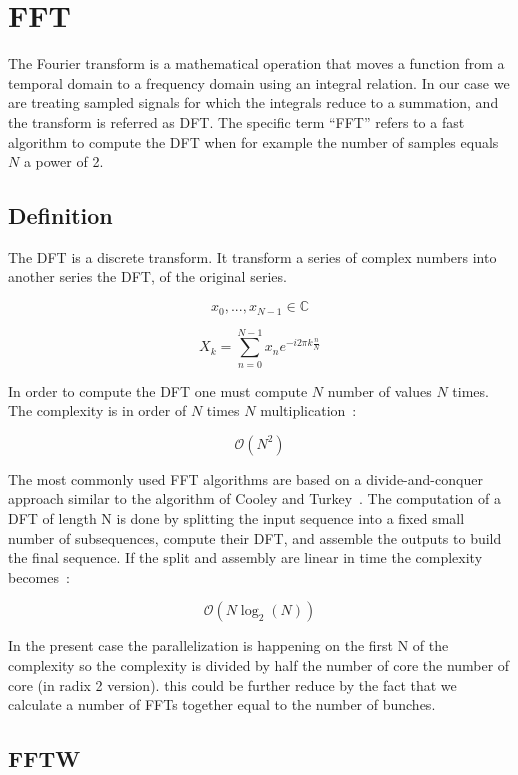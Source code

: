 \section{FFT}
\label{sec:FFT}

The Fourier transform is a mathematical operation that moves a function from a temporal domain to a frequency domain using an integral relation. In our case we are treating sampled signals for which the integrals reduce to a summation, and the transform is referred as \gls{DFT}. The specific term ``\gls{FFT}'' refers to a fast algorithm to compute the \gls{DFT} when for example the number of samples equals $N$ a power of 2.

\subsection{Definition}

The \gls{DFT} is a discrete transform. It transform a series of complex numbers into another series the \gls{DFT}, of the original series.

$$ x_0,...,x_{N -1} \in \mathbb{C} $$

$$ X_{k} = \displaystyle\sum\limits_{n = 0}^{N -1} x_{n}e^{-i 2 \pi k \frac{n}{N}} $$

In order to compute the \gls{DFT} one must compute $N$ number of values $N$ times. The complexity is in order of $N$ times $N$ multiplication~:

$$ \mathcal{O}(N^{2}) $$

The most commonly used \gls{FFT} algorithms are based on a divide-and-conquer approach similar to the algorithm of Cooley and Turkey~\cite{Cooley65}. The computation of a \gls{DFT} of length N is done by splitting the input sequence into a fixed small number of subsequences, compute their \gls{DFT}, and assemble the outputs to build the final sequence. If the split and assembly are linear in time the complexity becomes~:

$$ \mathcal{O}(N \log_{2}(N)) $$

In the present case the parallelization is happening on the first N of the complexity so the complexity is divided by half the number of core the number of core (in radix 2 version). this could be further reduce by the fact that we calculate a number of \glspl{FFT} together equal to the number of bunches.

\subsection{FFTW}

